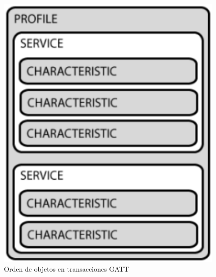 \begin{figure}[H]
	\centering
	\includegraphics[scale=0.4]{figuras/rn4020/orden_gatt.png}
	\caption{Orden de objetos en transacciones GATT \cite{RN4020}}
	\label{orden_gatt}
\end{figure}

